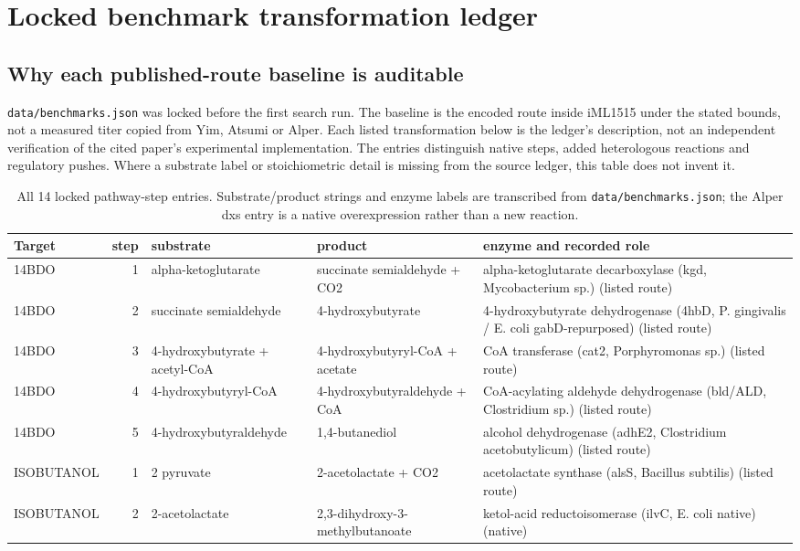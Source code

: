 \section{Locked benchmark transformation ledger}
\subsection{Why each published-route baseline is auditable}
\texttt{data/benchmarks.json} was locked before the first search run. The baseline is the encoded route inside iML1515 under the stated bounds, not a measured titer copied from Yim, Atsumi or Alper. Each listed transformation below is the ledger's description, not an independent verification of the cited paper's experimental implementation. The entries distinguish native steps, added heterologous reactions and regulatory pushes. Where a substrate label or stoichiometric detail is missing from the source ledger, this table does not invent it.\begin{table}[!htbp]\centering\scriptsize\caption{All 14 locked pathway-step entries. Substrate/product strings and enzyme labels are transcribed from \texttt{data/benchmarks.json}; the Alper dxs entry is a native overexpression rather than a new reaction.}\begin{tabular}{p{1.4cm}rp{2.5cm}p{2.5cm}p{3.4cm}}\hline Target & step & substrate & product & enzyme and recorded role \\\hline
14BDO & 1 & alpha-ketoglutarate & succinate semialdehyde + CO2 & alpha-ketoglutarate decarboxylase (kgd, Mycobacterium sp.) (listed route) \\
14BDO & 2 & succinate semialdehyde & 4-hydroxybutyrate & 4-hydroxybutyrate dehydrogenase (4hbD, P. gingivalis / E. coli gabD-repurposed) (listed route) \\
14BDO & 3 & 4-hydroxybutyrate + acetyl-CoA & 4-hydroxybutyryl-CoA + acetate & CoA transferase (cat2, Porphyromonas sp.) (listed route) \\
14BDO & 4 & 4-hydroxybutyryl-CoA & 4-hydroxybutyraldehyde + CoA & CoA-acylating aldehyde dehydrogenase (bld/ALD, Clostridium sp.) (listed route) \\
14BDO & 5 & 4-hydroxybutyraldehyde & 1,4-butanediol & alcohol dehydrogenase (adhE2, Clostridium acetobutylicum) (listed route) \\
ISOBUTANOL & 1 & 2 pyruvate & 2-acetolactate + CO2 & acetolactate synthase (alsS, Bacillus subtilis) (listed route) \\
ISOBUTANOL & 2 & 2-acetolactate & 2,3-dihydroxy-3-methylbutanoate & ketol-acid reductoisomerase (ilvC, E. coli native) (native) \\

\end{tabular}
\end{table}

